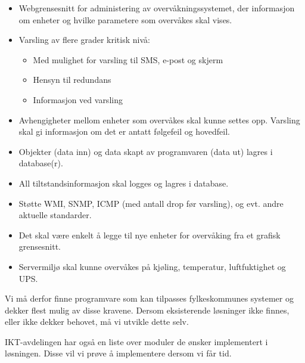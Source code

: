 \begin{itemize}
	\item Webgrensesnitt for administering av overvåkningssystemet, der informasjon om enheter og hvilke parametere som overvåkes skal vises.
	\item  Varsling av flere grader kritisk nivå:
	\begin{itemize} 
		\item Med mulighet for varsling til SMS, e-post og skjerm
		\item Hensyn til redundans
		\item Informasjon ved varsling
	\end{itemize}
	\item Avhengigheter mellom enheter som overvåkes skal kunne settes opp. Varsling skal gi informasjon om det er antatt følgefeil og hovedfeil.
	\item Objekter (data inn) og data skapt av programvaren (data ut) lagres i database(r).
	\item All tiltstandsinformasjon skal logges og lagres i database.
	\item Støtte WMI, SNMP, ICMP (med antall drop før varsling), og evt. andre aktuelle standarder.
	\item Det skal være enkelt å legge til nye enheter for overvåking fra et grafisk grensesnitt.
	\item Servermiljø skal kunne overvåkes på kjøling, temperatur, luftfuktighet og UPS.
\end{itemize}

Vi må derfor finne programvare som kan tilpasses fylkeskommunes systemer og dekker flest mulig av disse kravene. Dersom eksisterende løsninger ikke finnes, eller ikke dekker behovet, må vi utvikle dette selv.

IKT-avdelingen har også en liste over moduler de ønsker implementert i løsningen. Disse vil vi prøve å implementere dersom vi får tid.

